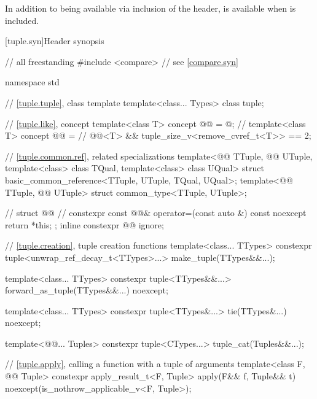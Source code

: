 \pnum
In addition to being available via inclusion of the  header,
 is available when
 is included.

[tuple.syn]{Header  synopsis}

%
\begin{codeblock}
// all freestanding
#include <compare>              // see \ref{compare.syn}

namespace std {
  // \ref{tuple.tuple}, class template 
  template<class... Types>
    class tuple;

  // \ref{tuple.like}, concept 
  template<class T>
    concept @@ = @\seebelownc@;         // \expos
  template<class T>
    concept @@ =                     // \expos
      @@<T> && tuple_size_v<remove_cvref_t<T>> == 2;

  // \ref{tuple.common.ref},  related specializations
  template<@@ TTuple, @@ UTuple,
           template<class> class TQual, template<class> class UQual>
    struct basic_common_reference<TTuple, UTuple, TQual, UQual>;
  template<@@ TTuple, @@ UTuple>
    struct common_type<TTuple, UTuple>;

  // 
  struct @@ {                      // \expos
    constexpr const @@&
      operator=(const auto &) const noexcept { return *this; }
  };
  inline constexpr @@ ignore;

  // \ref{tuple.creation}, tuple creation functions
  template<class... TTypes>
    constexpr tuple<unwrap_ref_decay_t<TTypes>...> make_tuple(TTypes&&...);

  template<class... TTypes>
    constexpr tuple<TTypes&&...> forward_as_tuple(TTypes&&...) noexcept;

  template<class... TTypes>
    constexpr tuple<TTypes&...> tie(TTypes&...) noexcept;

  template<@@... Tuples>
    constexpr tuple<CTypes...> tuple_cat(Tuples&&...);

  // \ref{tuple.apply}, calling a function with a tuple of arguments
  template<class F, @@ Tuple>
    constexpr apply_result_t<F, Tuple> apply(F&& f, Tuple&& t)
      noexcept(is_nothrow_applicable_v<F, Tuple>);

}
\end{codeblock}
